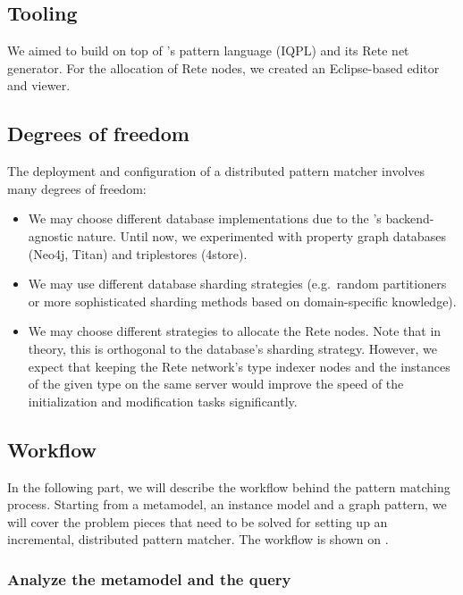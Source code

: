\subsection{Tooling}

We aimed to build \iqd{} on top of \eiq{}'s pattern language (IQPL) and its Rete net generator. For the allocation of Rete nodes, we created an Eclipse-based editor and viewer.

\subsection{Degrees of freedom}

The deployment and configuration of a distributed pattern matcher involves many degrees of freedom:

\begin{itemize}
  \item We may choose different database implementations due to the \iqd{}'s backend-agnostic nature. Until now, we experimented with property graph databases (Neo4j, Titan) and triplestores (4store).
  \item We may use different database sharding strategies (e.g.\ random partitioners or more sophisticated sharding methods based on domain-specific knowledge).
  \item We may choose different strategies to allocate the Rete nodes. Note that in theory, this is orthogonal to the database's sharding strategy. However, we expect that keeping the Rete network's type indexer nodes and the instances of the given type on the same server would improve the speed of the initialization and modification tasks significantly.
\end{itemize}
 
\subsection{Workflow}
\label{subsec:workflow}

In the following part, we will describe the workflow behind the pattern matching process. Starting from a metamodel, an instance model and a graph pattern, we will cover the problem pieces that need to be solved for setting up an incremental, distributed pattern matcher. The workflow is shown on .


\subsubsection{Analyze the metamodel and the query}


